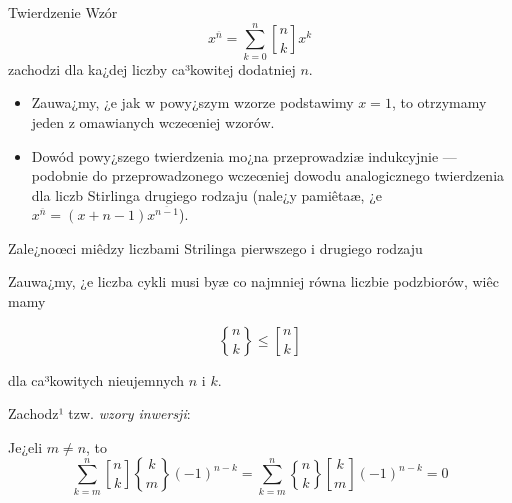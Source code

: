 \documentclass[a4paper,10pt]{beamer}
\begin{document}
\begin{frame}
\begin{block}{Twierdzenie}
Wzór
$$x^{\overline{n}}=\sum_{k=0}^n{n\brack k}x^k$$
zachodzi dla ka¿dej liczby ca³kowitej dodatniej $n$.
\end{block}

\bigskip

\begin{itemize}
\item Zauwa¿my, ¿e jak w powy¿szym wzorze podstawimy $x=1$, to otrzymamy jeden z omawianych wczeœniej wzorów.
\item Dowód powy¿szego twierdzenia mo¿na przeprowadziæ indukcyjnie --- podobnie do przeprowadzonego wczeœniej dowodu analogicznego twierdzenia dla liczb Stirlinga drugiego rodzaju (nale¿y pamiêtaæ, ¿e $\displaystyle x^{\overline{n}}=(x+n-1)x^{\overline{n-1}}$).
\end{itemize}
\end{frame}








\begin{frame}{Zale¿noœci miêdzy liczbami Strilinga pierwszego i drugiego rodzaju}

Zauwa¿my, ¿e liczba cykli musi byæ co najmniej równa liczbie podzbiorów, wiêc mamy
\begin{block}{}
$${n\brace k}\leqslant{n\brack k}$$
\end{block}
dla ca³kowitych nieujemnych $n$ i $k$.

\bigskip

Zachodz¹ tzw. {\it wzory inwersji}:

\begin{block}{}
Je¿eli $m\neq n$, to
$$\sum\limits_{k=m}^n{n\brack k}{k\brace m}(-1)^{n-k}=\sum\limits_{k=m}^n{n\brace k}{k\brack m}(-1)^{n-k}=0$$
\end{block}


\end{frame}
\end{document}
